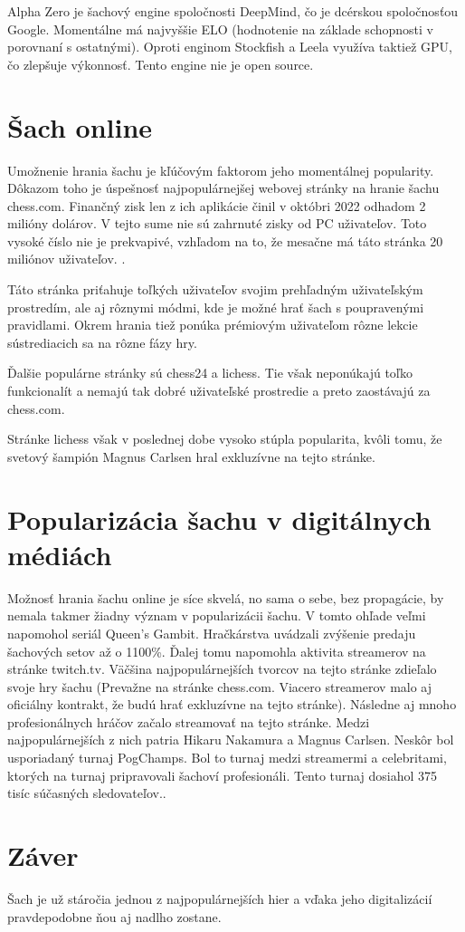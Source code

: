 \documentclass[10pt,twoside,slovak,a4paper]{article}
\begin{document}
Alpha Zero je šachový engine spoločnosti DeepMind, čo je dcérskou spoločnosťou Google. Momentálne má najvyššie ELO (hodnotenie na základe schopnosti v porovnaní s ostatnými). Oproti enginom Stockfish a Leela využíva taktiež GPU, čo zlepšuje výkonnosť. Tento engine nie je open source.

\section{Šach online} \label{online}

Umožnenie hrania šachu je kľúčovým faktorom jeho momentálnej popularity. Dôkazom toho je úspešnosť najpopulárnejšej webovej stránky na hranie šachu chess.com. Finančný zisk len z ich aplikácie činil v októbri 2022 odhadom 2 milióny dolárov\cite{ChessCom-Revenue}. V tejto sume nie sú zahrnuté zisky od PC uživateľov. Toto vysoké číslo nie je prekvapivé, vzhľadom na to, že mesačne má táto stránka 20 miliónov uživateľov. \cite{ChessCom-MonthlyUsers}. 

Táto stránka priťahuje toľkých uživateľov svojim prehľadným uživateľským prostredím, ale aj rôznymi módmi, kde je možné hrať šach s poupravenými pravidlami. Okrem hrania tiež ponúka prémiovým uživateľom rôzne lekcie sústrediacich sa na rôzne fázy hry. 

Ďalšie populárne stránky sú chess24 a lichess. Tie však neponúkajú toľko funkcionalít a nemajú tak dobré uživateľské prostredie a preto zaostávajú za chess.com. 

Stránke lichess však v poslednej dobe vysoko stúpla popularita, kvôli tomu, že svetový šampión Magnus Carlsen hral exkluzívne na tejto stránke. 



\section{Popularizácia šachu v digitálnych médiách} \label{media}

Možnosť hrania šachu online je síce skvelá, no sama o sebe, bez propagácie, by nemala takmer žiadny význam v popularizácii šachu. V tomto ohľade veľmi napomohol seriál Queen's Gambit. Hračkárstva uvádzali zvýšenie predaju šachových setov až o 1100\%\cite{PostQGSales}. Ďalej tomu napomohla aktivita streamerov na stránke twitch.tv. Väčšina najpopulárnejších tvorcov na tejto stránke zdieľalo svoje hry šachu (Prevažne na stránke chess.com. Viacero streamerov malo aj oficiálny kontrakt, že budú hrať exkluzívne na tejto stránke). Následne aj mnoho profesionálnych hráčov začalo streamovať na tejto stránke. Medzi najpopulárnejších z nich patria Hikaru Nakamura a Magnus Carlsen. Neskôr bol usporiadaný turnaj PogChamps. Bol to turnaj medzi streamermi a celebritami, ktorých na turnaj pripravovali šachoví profesionáli. Tento turnaj dosiahol 375 tisíc súčasných sledovateľov.\cite{Keener-Boom}.


\section{Záver} \label{zaver} 
Šach je už stáročia jednou z najpopulárnejších hier a vďaka jeho digitalizácií pravdepodobne ňou aj nadlho zostane.





\end{document}

